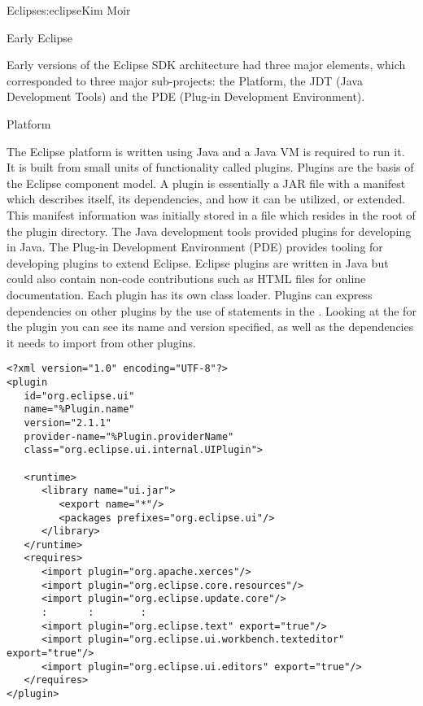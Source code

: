\begin{aosachapter}{Eclipse}{s:eclipse}{Kim Moir}
\begin{aosasect1}{Early Eclipse}

Early versions of the Eclipse SDK architecture had three major
elements, which corresponded to three major sub-projects: the
Platform, the JDT (Java Development Tools) and the PDE (Plug-in
Development Environment).

\begin{aosasect2}{Platform}

The Eclipse platform is written using Java and a Java VM is required
to run it. It is built from small units of functionality called
plugins.  Plugins are the basis of the Eclipse component model. A
plugin is essentially a JAR file with a manifest which describes
itself, its dependencies, and how it can be utilized, or
extended. This manifest information was initially stored in
a  file which resides in the root of the plugin
directory.  The Java development tools provided plugins for
developing in Java. The Plug-in Development Environment (PDE) provides
tooling for developing plugins to extend Eclipse.  Eclipse plugins
are written in Java but could also contain non-code contributions such
as HTML files for online documentation. Each plugin has its own class
loader.  Plugins can express dependencies on other plugins by the
use of  statements in the . Looking at the
 for the  plugin you can see its name
and version specified, as well as the dependencies it needs to import
from other plugins.

\begin{verbatim}
<?xml version="1.0" encoding="UTF-8"?>
<plugin
   id="org.eclipse.ui"
   name="%Plugin.name"
   version="2.1.1"
   provider-name="%Plugin.providerName"
   class="org.eclipse.ui.internal.UIPlugin">

   <runtime>
      <library name="ui.jar">
         <export name="*"/>
         <packages prefixes="org.eclipse.ui"/>
      </library>
   </runtime>
   <requires>
      <import plugin="org.apache.xerces"/>
      <import plugin="org.eclipse.core.resources"/>
      <import plugin="org.eclipse.update.core"/>
      :       :        :
      <import plugin="org.eclipse.text" export="true"/>
      <import plugin="org.eclipse.ui.workbench.texteditor" export="true"/>
      <import plugin="org.eclipse.ui.editors" export="true"/>
   </requires>
</plugin>
\end{verbatim}


\end{aosasect2}
\end{aosasect1}
\end{aosachapter}

